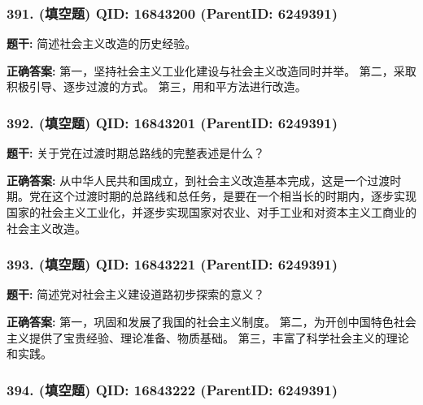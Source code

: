 \documentclass[12pt,UTF8]{ctexart}
\begin{document}
\subsubsection*{391. (填空题) \small QID: 16843200 (ParentID: 6249391)}

\textbf{题干:}
简述社会主义改造的历史经验。



\textbf{正确答案:}
第一，坚持社会主义工业化建设与社会主义改造同时并举。
第二，采取积极引导、逐步过渡的方式。
第三，用和平方法进行改造。

\vspace{0.3em}\hrulefill\vspace{0.7em}

\subsubsection*{392. (填空题) \small QID: 16843201 (ParentID: 6249391)}

\textbf{题干:}
关于党在过渡时期总路线的完整表述是什么？



\textbf{正确答案:}
从中华人民共和国成立，到社会主义改造基本完成，这是一个过渡时期。党在这个过渡时期的总路线和总任务，是要在一个相当长的时期内，逐步实现国家的社会主义工业化，并逐步实现国家对农业、对手工业和对资本主义工商业的社会主义改造。

\vspace{0.3em}\hrulefill\vspace{0.7em}

\subsubsection*{393. (填空题) \small QID: 16843221 (ParentID: 6249391)}

\textbf{题干:}
简述党对社会主义建设道路初步探索的意义？



\textbf{正确答案:}
第一，巩固和发展了我国的社会主义制度。
第二，为开创中国特色社会主义提供了宝贵经验、理论准备、物质基础。
第三，丰富了科学社会主义的理论和实践。

\vspace{0.3em}\hrulefill\vspace{0.7em}

\subsubsection*{394. (填空题) \small QID: 16843222 (ParentID: 6249391)}
\end{document}
